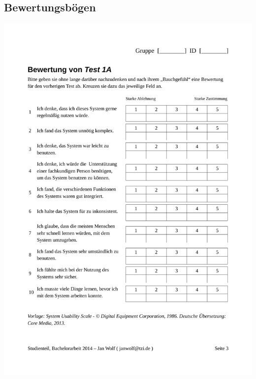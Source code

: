 \documentclass[a4paper,12pt,bibliography=totoc]{scrreprt}%
\begin{document}
\begin{appendix}
\section{Bewertungsbögen}
\includegraphics[width=\textwidth, page=1]{apx/Bewertungsboegen}
\label{lab:Bewertungsbögen}


\end{appendix}
\end{document}
